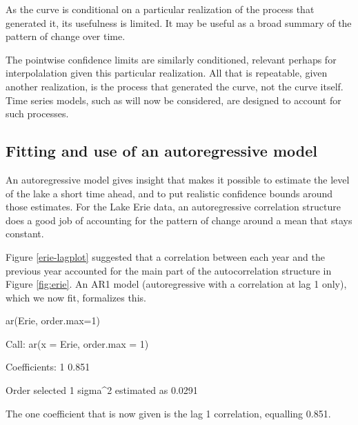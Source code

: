 \begin{marginfigure}[-5cm]
\begin{Schunk}
\end{Schunk}
\end{marginfigure}

As the curve is conditional on a particular realization of the process
that generated it, its usefulness is limited.  It may be useful as a
broad summary of the pattern of change over time.

The pointwise confidence limits are similarly conditioned, relevant
perhaps for interpolalation given this particular realization.
All that is repeatable, given another realization, is the
process that generated the curve, not the curve itself. Time series
models, such as will now be considered, are designed to account for
such processes.

\subsection{Fitting and use of an autoregressive model}

An autoregressive model gives insight that makes it possible to
estimate the level of the lake a short time ahead, and to put
realistic confidence bounds around those estimates.  For the Lake Erie
data, an autoregressive correlation structure does a good job of
accounting for the pattern of change around a mean that stays
constant.

Figure \ref{erie-lagplot} suggested that a correlation between each
year and the previous year accounted for the main part of the
autocorrelation structure in Figure \ref{fig:erie}. An AR1 model
(autoregressive with a correlation at lag 1 only), which we now fit,
formalizes this.
\begin{Schunk}
\begin{Sinput}
ar(Erie, order.max=1)
\end{Sinput}
\begin{Soutput}

Call:
ar(x = Erie, order.max = 1)

Coefficients:
    1  
0.851  

Order selected 1  sigma^2 estimated as  0.0291
\end{Soutput}
\end{Schunk}
The one coefficient that is now given is the lag 1 correlation,
equalling 0.851.

